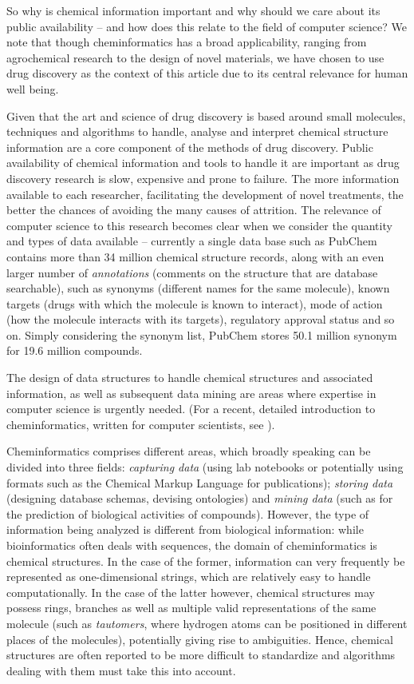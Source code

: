 \documentclass{sig-alternate}
\begin{document}
So why is chemical information important and why should we care about
its public availability -- and how does this relate to the field of
computer science? We note that though cheminformatics has a broad
applicability, ranging from agrochemical research to the design of
novel materials, we have chosen to use drug discovery as the context
of this article due to its central relevance for human well being.

Given that the art and science of drug discovery is based around small
molecules, techniques and algorithms to handle, analyse and interpret
chemical structure information are a core component of the methods of drug
discovery. Public availability of chemical information and
tools to handle it are important as drug discovery research is slow,
expensive and prone to failure. The more information available to each
researcher, facilitating the development of novel treatments, the
better the chances of avoiding the many causes of attrition. The
relevance of computer science to this research becomes clear when we
consider the quantity and types of data available -- currently a
single data base such as PubChem contains more than 34 million
chemical structure records, along with an even larger number of
\emph{annotations} (comments on the structure that are database
searchable), such as synonyms (different names for the same molecule),
known targets (drugs with which the molecule is known to interact),
mode of action (how the molecule interacts with its targets),
regulatory approval status and so on.  Simply considering the synonym
list, PubChem stores 50.1 million synonym for 19.6 million compounds.

The design of data structures to handle chemical structures and
associated information, as well as subsequent data mining are areas
where expertise in computer science is urgently needed. (For a recent,
detailed introduction to cheminformatics, written for computer
scientists, see \cite{brown2009}).

Cheminformatics comprises different areas, which broadly speaking can
be divided into three fields: \emph{capturing data} (using lab
notebooks or potentially using formats such as the Chemical Markup
Language for publications); \emph{storing data} (designing database
schemas, devising ontologies) and \emph{mining data} (such as for the
prediction of biological activities of compounds).  However, the type
of information being analyzed is different from biological
information: while bioinformatics often deals with sequences, the
domain of cheminformatics is chemical structures. In the case of the
former, information can very frequently be represented as
one-dimensional strings, which are relatively easy to handle
computationally. In the case of the latter however, chemical
structures may possess rings, branches as well as multiple valid
representations of the same molecule (such as \emph{tautomers}, where
hydrogen atoms can be positioned in different places of the
molecules), potentially giving rise to ambiguities. Hence, chemical
structures are often reported to be more difficult to standardize and
algorithms dealing with them must take this into account.
\end{document}
